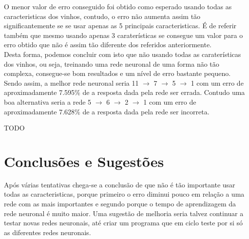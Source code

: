 \documentclass{article}
\begin{document}
O menor valor de erro conseguido foi obtido como esperado usando todas as caracteristicas dos vinhos, contudo, o erro não aumenta assim tão significantemente se se usar apenas as 5 principais caracteristicas. É de referir também que mesmo usando apenas 3 caraterísticas se consegue um valor para o erro obtido que não é assim tão diferente dos referidos anteriormente.\\
Desta forma, podemos concluir com isto que não usando todas as caraterísticas dos vinhos, ou seja, treinando uma rede neuronal de uma forma não tão complexa, consegue-se bom resultados e um nível de erro bastante pequeno.
Sendo assim, a melhor rede neuronal seria 11 $\to$ 7 $\to$ 5 $\to$ 1 com um erro de aproximadamente 7.595\% de a resposta dada pela rede ser errada. Contudo uma boa alternativa seria a rede 5 $\to$ 6 $\to$ 2 $\to$ 1 com um erro de aproximadamente 7.628\% de a resposta dada pela rede ser incorreta.

{\color{red}TODO}

\newpage

\vspace*{\fill}
\section{Conclusões e Sugestões}
Após várias tentativas chega-se a conclusão de que não é tão importante usar todas as caracteristicas, porque primeiro o erro diminui pouco em relação a uma rede com as mais importantes e segundo porque o tempo de aprendizagem da rede neuronal é muito maior. Uma sugestão de melhoria seria talvez continuar a testar novas redes neuronais, até criar um programa que em ciclo teste por si só as diferentes redes neuronais.
\vspace*{\fill}

\newpage
\end{document}
